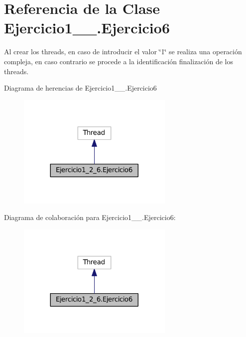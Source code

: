 \hypertarget{class_ejercicio1__2__6_1_1_ejercicio6}{}\section{Referencia de la Clase Ejercicio1\+\_\+\_.\+Ejercicio6}
\label{class_ejercicio1__2__6_1_1_ejercicio6}


Al crear los threads, en caso de introducir el valor \char`\"{}1\char`\"{} se realiza una operación compleja, en caso contrario se procede a la identificación finalización de los threads.  




Diagrama de herencias de Ejercicio1\+\_\+\_.\+Ejercicio6
\nopagebreak
\begin{figure}[H]
\begin{center}
\leavevmode
\includegraphics[width=212pt]{class_ejercicio1__2__6_1_1_ejercicio6__inherit__graph}
\end{center}
\end{figure}


Diagrama de colaboración para Ejercicio1\+\_\+\_.\+Ejercicio6\+:
\nopagebreak
\begin{figure}[H]
\begin{center}
\leavevmode
\includegraphics[width=212pt]{class_ejercicio1__2__6_1_1_ejercicio6__coll__graph}
\end{center}
\end{figure}
